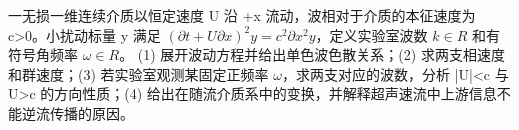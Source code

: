 一无损一维连续介质以恒定速度 U 沿 +x 流动，波相对于介质的本征速度为 c>0。小扰动标量 y 满足 \((\partial t+U\partial x)^{2}y=c^{2}\partial x^{2}y\)，定义实验室波数 \(k\in R\) 和有符号角频率 \(\omega \in R\)。
(1) 展开波动方程并给出单色波色散关系；(2) 求两支相速度和群速度；(3) 若实验室观测某固定正频率 \(\omega \)，求两支对应的波数，分析 |U|<c 与 U>c 的方向性质；(4) 给出在随流介质系中的变换，并解释超声速流中上游信息不能逆流传播的原因。
